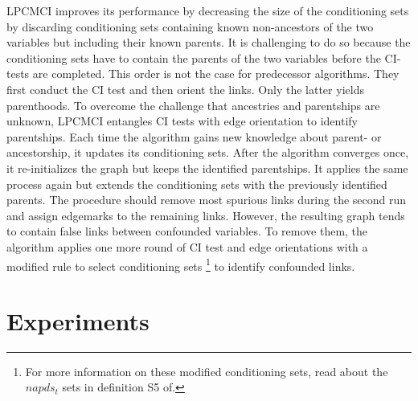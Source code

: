 \documentclass[conference]{IEEEtran}
\begin{document}
LPCMCI improves its performance by decreasing the size of the conditioning sets by discarding conditioning sets containing known non-ancestors of the two variables but including their known parents\cite{gerhardus_high-recall_2021}. It is challenging to do so because the conditioning sets have to contain the parents of the two variables before the CI-tests are completed. This order is not the case for predecessor algorithms. They first conduct the CI test and then orient the links. Only the latter yields parenthoods.
To overcome the challenge that ancestries and parentships are unknown, LPCMCI entangles CI tests with edge orientation to identify parentships. Each time the algorithm gains new knowledge about parent- or ancestorship, it updates its conditioning sets. After the algorithm converges once, it re-initializes the graph but keeps the identified parentships. 
It applies the same process again but extends the conditioning sets with the previously identified parents.
The procedure should remove most spurious links during the second run and assign edgemarks to the remaining links. 
However, the resulting graph tends to contain false links between confounded variables. 
To remove them, the algorithm applies one more round of CI test and edge orientations with a modified rule to select conditioning sets
\footnote{For more information on these modified conditioning sets, read about the $napds_t$ sets in definition S5 of\cite{gerhardus_high-recall_2021}.} 
to identify confounded links\cite{gerhardus_high-recall_2021}.




\section{Experiments}
\end{document}
